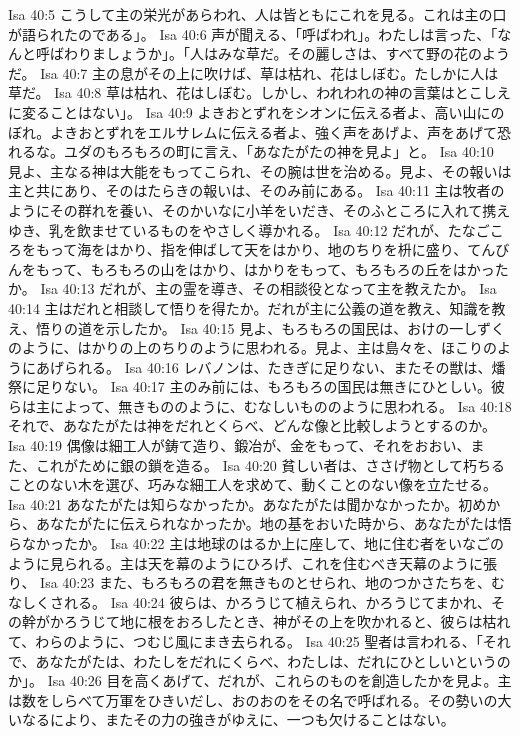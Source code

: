 Isa 40:5  こうして主の栄光があらわれ、人は皆ともにこれを見る。これは主の口が語られたのである」。
Isa 40:6  声が聞える、「呼ばわれ」。わたしは言った、「なんと呼ばわりましょうか」。「人はみな草だ。その麗しさは、すべて野の花のようだ。
Isa 40:7  主の息がその上に吹けば、草は枯れ、花はしぼむ。たしかに人は草だ。
Isa 40:8  草は枯れ、花はしぼむ。しかし、われわれの神の言葉はとこしえに変ることはない」。
Isa 40:9  よきおとずれをシオンに伝える者よ、高い山にのぼれ。よきおとずれをエルサレムに伝える者よ、強く声をあげよ、声をあげて恐れるな。ユダのもろもろの町に言え、「あなたがたの神を見よ」と。
Isa 40:10  見よ、主なる神は大能をもってこられ、その腕は世を治める。見よ、その報いは主と共にあり、そのはたらきの報いは、そのみ前にある。
Isa 40:11  主は牧者のようにその群れを養い、そのかいなに小羊をいだき、そのふところに入れて携えゆき、乳を飲ませているものをやさしく導かれる。
Isa 40:12  だれが、たなごころをもって海をはかり、指を伸ばして天をはかり、地のちりを枡に盛り、てんびんをもって、もろもろの山をはかり、はかりをもって、もろもろの丘をはかったか。
Isa 40:13  だれが、主の霊を導き、その相談役となって主を教えたか。
Isa 40:14  主はだれと相談して悟りを得たか。だれが主に公義の道を教え、知識を教え、悟りの道を示したか。
Isa 40:15  見よ、もろもろの国民は、おけの一しずくのように、はかりの上のちりのように思われる。見よ、主は島々を、ほこりのようにあげられる。
Isa 40:16  レバノンは、たきぎに足りない、またその獣は、燔祭に足りない。
Isa 40:17  主のみ前には、もろもろの国民は無きにひとしい。彼らは主によって、無きもののように、むなしいもののように思われる。
Isa 40:18  それで、あなたがたは神をだれとくらべ、どんな像と比較しようとするのか。
Isa 40:19  偶像は細工人が鋳て造り、鍛冶が、金をもって、それをおおい、また、これがために銀の鎖を造る。
Isa 40:20  貧しい者は、ささげ物として朽ちることのない木を選び、巧みな細工人を求めて、動くことのない像を立たせる。
Isa 40:21  あなたがたは知らなかったか。あなたがたは聞かなかったか。初めから、あなたがたに伝えられなかったか。地の基をおいた時から、あなたがたは悟らなかったか。
Isa 40:22  主は地球のはるか上に座して、地に住む者をいなごのように見られる。主は天を幕のようにひろげ、これを住むべき天幕のように張り、
Isa 40:23  また、もろもろの君を無きものとせられ、地のつかさたちを、むなしくされる。
Isa 40:24  彼らは、かろうじて植えられ、かろうじてまかれ、その幹がかろうじて地に根をおろしたとき、神がその上を吹かれると、彼らは枯れて、わらのように、つむじ風にまき去られる。
Isa 40:25  聖者は言われる、「それで、あなたがたは、わたしをだれにくらべ、わたしは、だれにひとしいというのか」。
Isa 40:26  目を高くあげて、だれが、これらのものを創造したかを見よ。主は数をしらべて万軍をひきいだし、おのおのをその名で呼ばれる。その勢いの大いなるにより、またその力の強きがゆえに、一つも欠けることはない。
